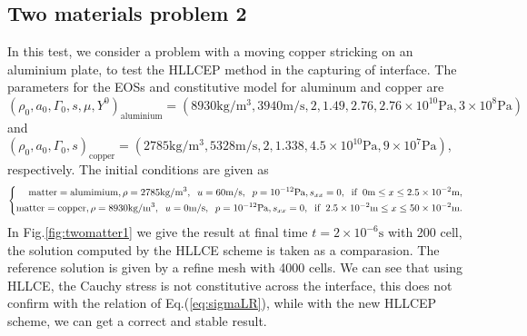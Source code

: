 \documentclass{article}
\numberwithin{equation}{section}
\numberwithin{table}{section}
\begin{document}
\subsection{Two materials problem 2}
In this test, we consider a problem with a moving  copper stricking on an  aluminium plate, to test the HLLCEP method in the capturing of interface. The parameters for the EOSs and constitutive model for  aluminum and copper  are  $ (\rho_0, a_0, \Gamma_0, s, \mu, Y^0)_{\text{aluminium}} =(8930 \text{kg}/\text{m}^3, 3940 \text{m}/\text{s},2, 1.49, 2.76 ,2.76\times 10^{10} \text{Pa},3\times 10^8 \text{Pa} )$ and   $(\rho_0, a_0, \Gamma_0, s)_{\text{copper}} =(2785 \text{kg}/\text{m}^3, 5328 \text{m}/\text{s},2, 1.338,4.5\times 10^{10}\text{Pa},9\times 10^7 \text{Pa})$, respectively. The initial conditions are  given as
\begin{equation}
  \left\{ \begin{aligned}
	  \text{matter} = \text{alumimium}, \rho = 2785 \text{kg}/\text{m}^3, \hspace{0.2cm} u = 60\text{m}/\text{s}, \hspace{0.2cm} p = 10^{-12}\text{Pa}, s_{xx} = 0, \hspace{0.2cm} \text{if} \hspace{0.2cm} 0\text{m} \le x \le 2.5\times 10^{-2} \text{m},\\
	  \text{matter} = \text{copper}, \rho = 8930 \text{kg}/\text{m}^3, \hspace{0.2cm} u = 0\text{m}/\text{s}, \hspace{0.2cm} p = 10^{-12}\text{Pa}, s_{xx} = 0, \hspace{0.2cm} \text{if} \hspace{0.2cm} 2.5 \times 10^{-2}\text{m} \le x \le 50\times 10^{-2} \text{m}.\\
	\end{aligned}
  \right.
\end{equation}
In Fig.\ref{fig:twomatter1} we give the result at final time $ t= 2 \times 10^{-6} \text{s}$ with 200 cell, the solution computed by  the HLLCE scheme is taken as a comparasion. The reference solution is given by a refine mesh with 4000 cells. We can see that using HLLCE, the Cauchy stress is not constitutive across the interface, this does not confirm with the relation of Eq.(\ref{eq:sigmaLR}), while with the new HLLCEP scheme, we can get a correct and stable result. 
\end{document}
